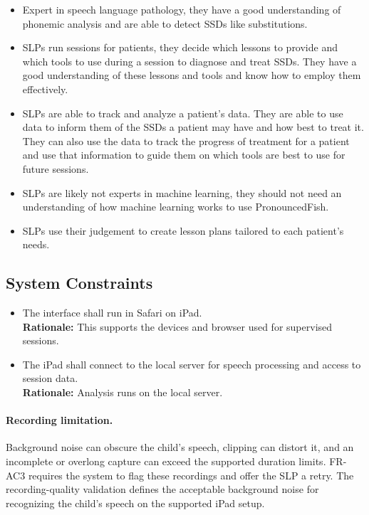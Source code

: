 \documentclass[12pt]{article}
\newcounter{scnum} %
\newcommand{\scthescnum}{SC\thescnum}
\begin{document}
\begin{itemize}
    \item Expert in speech language pathology, they have a good understanding of phonemic analysis and are able to detect SSDs like substitutions.
    \item SLPs run sessions for patients, they decide which lessons to provide and which tools to use during a session to diagnose and treat SSDs. They have a good understanding of these lessons and tools and know how to employ them effectively.
    \item SLPs are able to track and analyze a patient's data. They are able to use data to inform them of the SSDs a patient may have and how best to treat it. They can also use the data to track the progress of treatment for a patient and use that information to guide them on which tools are best to use for future sessions.
    \item SLPs are likely not experts in machine learning, they should not need an understanding of how machine learning works to use PronouncedFish. 
    \item SLPs use their judgement to create lesson plans tailored to each patient's needs.
\end{itemize}


\subsection{System Constraints}

\begin{itemize}
\item[\stepcounter{scnum}\scthescnum \label{iPad Functionality}: ] The interface shall run in Safari on iPad.\\
\textbf{Rationale:} This supports the devices and browser used for supervised sessions.
\item[\stepcounter{scnum}\scthescnum \label{Local Server Connectivity}: ] The iPad shall connect to the local server for speech processing and access to session data.\\
\textbf{Rationale:} Analysis runs on the local server.

\end{itemize}

\paragraph{Recording limitation.}
Background noise can obscure the child's speech, clipping can distort it,
and an incomplete or overlong capture can exceed the supported duration
limits. FR-AC3 requires the system to flag these recordings and offer
the SLP a retry. The recording-quality validation defines the acceptable
background noise for recognizing the child's speech on the supported iPad
setup.
\end{document}
